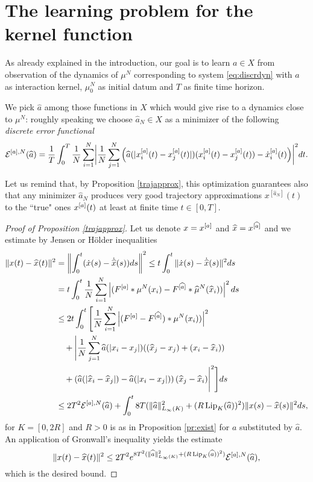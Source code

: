 
\section{The learning problem for the kernel function}\label{sec:learn}

As already explained in the introduction, our goal is to learn $a \in X$ from observation of the dynamics of $\mu^N$ corresponding to system \eqref{eq:discrdyn} with $a$ as interaction kernel, $\mu_0^N$ as initial datum and $T$ as finite time horizon.

We pick $\widehat a$ among those functions in $X$ which would give rise to a dynamics close to $\mu^N$: roughly speaking we choose $\widehat a_N \in X$ as a minimizer of the following \textit{discrete error functional}
\begin{align}\label{eq-def-error}
	\begin{split}
	\mathcal E^{[a],N}(\widehat a) = \frac{1}{T}\int_0^T\frac{1}{N}\sum_{i=1}^N\biggl|\frac{1}{N}\sum_{j=1}^N
			\left(\widehat a(|x^{[a]}_i(t)-x^{[a]}_j(t)|)(x^{[a]}_i(t) - x^{[a]}_j(t))-\dot{x}^{[a]}_i(t)\right)\biggr|^2 dt.
	\end{split}
\end{align}

Let us remind that, by Proposition \ref{trajapprox}, this optimization guarantees also that any minimizer $\widehat a_N$ produces very good trajectory approximations $x^{[\widehat a_N]}(t)$ to the
``true" ones $x^{[a]}(t)$ at least at finite time $t \in [0,T]$.

\begin{proof}[Proof of Proposition \ref{trajapprox}]
Let us denote $x=x^{[a]} $ and $\widehat x =x^{[\widehat a]}  $ and we estimate by Jensen or H\"older inequalities
\begin{align*}
\|x(t) - \widehat x(t) \|^2 & = \left \| \int_0^t ( \dot x(s) - \dot{\widehat x}(s)) ds \right \|^2 \leq  t \int_0^t \| \dot x(s) - \dot{\widehat x}(s) \|^2 ds \\
&=  t \int_0^t \frac{1}{N} \sum_{i=1}^N \left | (F^{[a]} * \mu^N(x_i)- F^{[\widehat a]} * \widehat \mu^N(\widehat x_i)) \right |^2 ds\\
&\leq 2 t \int_0^t \Bigg[  \frac{1}{N} \sum_{i=1}^N \left| (F^{[a]} - F^{[\widehat a]}) *  \mu^N( x_i)) \right |^2 \\
&\quad +\Bigg| \frac{1}{N} \sum_{j=1}^N \widehat a(|x_i-x_j|)( (\widehat x_j - x_j) + (x_i-\widehat x_i))  \\
&\quad+ \left(\widehat a(| \widehat x_i-\widehat x_j|) -  \widehat a(| x_i- x_j |)\right) (\widehat x_j - \widehat x_i) \Bigg|^2  \Bigg ] ds \\
&\leq 2 T^2 \mathcal E^{[a],N}(\widehat a) +  \int_0^t 8 T( \|\widehat a\|_{L_\infty(K)}^2 + (R \operatorname{Lip}_K(\widehat a) ) ^2 )\|x(s) - \widehat x(s) \|^2  ds,
\end{align*}
for $K=[0,2 R]$ and $R>0$ is as in Proposition \ref{pr:exist} for $a$ substituted by $\widehat a$.
An application of Gronwall's inequality yields the estimate
$$
\|x(t) - \widehat x(t) \|^2 \leq 2 T^2   e^{8 T^2( \|\widehat a\|_{L_\infty(K)}^2 + (R \operatorname{Lip}_K(\widehat a) ) ^2)} \mathcal E^{[a],N}(\widehat a),
$$
which is the desired bound.
\end{proof}


